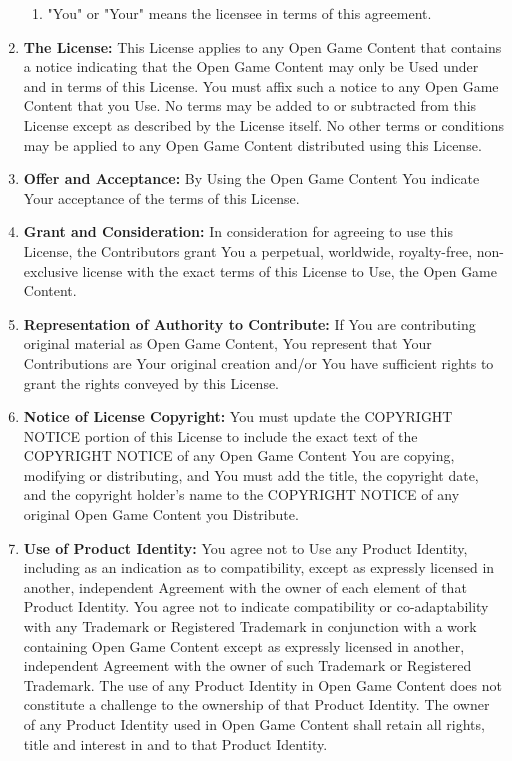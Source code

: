 \begin{enumerate}
\begin{enumerate}
 \item "You" or "Your" means the licensee in terms of this agreement.
\end{enumerate}
 \item \textbf{The License:} This License applies to any Open Game Content that contains a notice indicating that the Open Game Content may only be Used under and in terms of this License. You must affix such a notice to any Open Game Content that you Use. No terms may be added to or subtracted from this License except as described by the License itself. No other terms or conditions may be applied to any Open Game Content distributed using this License.
 \item \textbf{Offer and Acceptance:} By Using the Open Game Content You indicate Your acceptance of the terms of this License.
 \item \textbf{Grant and Consideration:} In consideration for agreeing to use this License, the Contributors grant You a perpetual, worldwide, royalty-free, non-exclusive license with the exact terms of this License to Use, the Open Game Content.
 \item \textbf{Representation of Authority to Contribute:} If You are contributing original material as Open Game Content, You represent that Your Contributions are Your original creation and/or You have sufficient rights to grant the rights conveyed by this License.
 \item \textbf{Notice of License Copyright:} You must update the COPYRIGHT NOTICE portion of this License to include the exact text of the COPYRIGHT NOTICE of any Open Game Content You are copying, modifying or distributing, and You must add the title, the copyright date, and the copyright holder's name to the COPYRIGHT NOTICE of any original Open Game Content you Distribute.
 \item \textbf{Use of Product Identity:} You agree not to Use any Product Identity, including as an indication as to compatibility, except as expressly licensed in another, independent Agreement with the owner of each element of that Product Identity. You agree not to indicate compatibility or co-adaptability with any Trademark or Registered Trademark in conjunction with a work containing Open Game Content except as expressly licensed in another, independent Agreement with the owner of such Trademark or Registered Trademark. The use of any Product Identity in Open Game Content does not constitute a challenge to the ownership of that Product Identity. The owner of any Product Identity used in Open Game Content shall retain all rights, title and interest in and to that Product Identity.

\end{enumerate}
